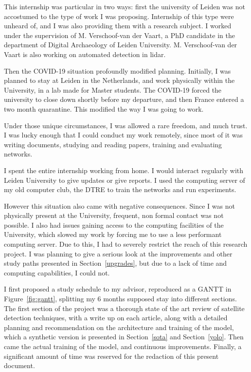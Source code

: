 This internship was particular in two ways: first the university of Leiden was not accostumed to the type of work I was proposing. Internship of this type were unheard of, and I was also providing them with a research subject. I worked under the supervision of M. Verschoof-van der Vaart, a PhD candidate in the department of Digital Archaeology of Leiden University. M. Verschoof-van der Vaart is also working on automated detection in \gls{lidar}.

Then the COVID-19 situation profoundly modified planning. Initially, I was planned to stay at Leiden in the Netherlands, and work physically within the University, in a lab made for Master students. The COVID-19 forced the university to close down shortly before my departure, and then France entered a two month quarantine. This modified the way I was going to work.  

Under those unique circumstances, I was allowed a rare freedom, and much trust. I was lucky enough that I could conduct my work remotely, since most of it was writing documents, studying and reading papers, training and evaluating networks. 

I spent the entire internship working from home. I would interact regularly with Leiden University to give updates or give reports. I used the computing server of my old computer club, the DTRE to train the networks and run experiments.

However this situation also came with negative consequences. Since I was not physically present at the University, frequent, non formal contact was not possible. I also had issues gaining access to the computing facilities of the University, which slowed my work by forcing me to use a less performant computing server. Due to this, I had to severely restrict the reach of this research project. I was planning to give a serious look at the improvements and other study paths presented in Section~\ref{upgrades}, but due to a lack of time and computing capabilities, I could not. 

I first proposed a study schedule to my advisor, reproduced as a GANTT in Figure~\ref{fig:gantt}, splitting my 6 months supposed stay into different sections. The first section of the project was a thorough state of the art review of satellite detection techniques, with a write up on each article, along with a detailed planning and recommendation on the architecture and training of the model, which a synthetic version is presented in Section~\ref{sota} and Section~\ref{yolo}. Then came the actual training of the model, and continuous improvements. Finally, a significant amount of time was reserved for the redaction of this present document.  

